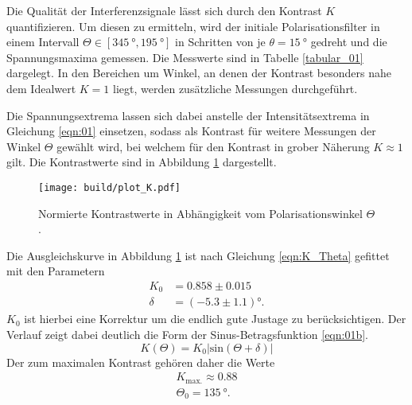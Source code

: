 \noindent Die Qualität der Interferenzsignale lässt sich durch den Kontrast $K$
quantifizieren. Um diesen zu ermitteln, wird der initiale Polarisationsfilter
in einem Intervall $\Theta \in [\SI{345}{\degree}, \SI{195}{\degree}]$
in Schritten von je $\theta = \SI{15}{\degree}$ gedreht und die Spannungsmaxima
gemessen. Die Messwerte sind in Tabelle \ref{tabular_01} dargelegt. In den
Bereichen um Winkel, an denen der Kontrast besonders nahe dem Idealwert $K= 1$
liegt, werden zusätzliche Messungen durchgeführt. \\
\FloatBarrier

\FloatBarrier
\noindent Die Spannungsextrema lassen sich dabei anstelle der Intensitätsextrema
in Gleichung \ref{eqn:01} einsetzen, sodass als Kontrast für weitere Messungen
der Winkel $\Theta$ gewählt wird, bei welchem für den Kontrast in grober Näherung
$K \approx 1$ gilt. Die Kontrastwerte sind in Abbildung \ref{fig:02} dargestellt.
\FloatBarrier
\begin{figure}
  \centering
  \texttt{[image: build/plot\_K.pdf]}
  \caption{Normierte Kontrastwerte in Abhängigkeit vom Polarisationswinkel $\Theta$.}
  \label{fig:02}
\end{figure}
\FloatBarrier
\noindent Die Ausgleichskurve in Abbildung \ref{fig:02} ist nach Gleichung \ref{eqn:K_Theta} gefittet mit den Parametern
\begin{align}
  K_0    &= 0.858 \pm 0.015\\
  \delta &= (-5.3 \pm 1.1)°.
\end{align}
$K_0$ ist hierbei eine Korrektur um die endlich gute Justage zu berücksichtigen.
Der Verlauf zeigt dabei deutlich die Form der Sinus-Betragsfunktion \ref{eqn:01b}. \\
\begin{equation}
  K(\Theta) = K_0 \left| \text{sin}(\Theta + \delta) \right| \label{eqn:K_Theta}
\end{equation}
\noindent Der zum maximalen Kontrast gehören daher die Werte
\begin{align*}
  K_\text{max.} \approx \num{0.88} \\
  \Theta_0 = \SI{135}{\degree}.
\end{align*}
